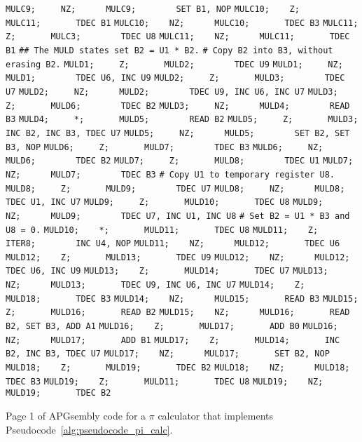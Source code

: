 \begin{apgsembly}
\begin{minipage}[t]{.49\textwidth}
\begin{algorithmic}
			\State \verb|MULC9;     NZ;      MULC9;        SET B1, NOP|
			\State \verb|MULC10;    Z;       MULC11;       TDEC B1|
			\State \verb|MULC10;    NZ;      MULC10;       TDEC B3|
			\State \verb|MULC11;    Z;       MULC3;        TDEC U8|
			\State \verb|MULC11;    NZ;      MULC11;       TDEC B1|
			\State \verb||
			\State \verb|## The MULD states set B2 = U1 * B2.|
			\State \verb|# Copy B2 into B3, without erasing B2.|
			\State \verb|MULD1;     Z;       MULD2;        TDEC U9|
			\State \verb|MULD1;     NZ;      MULD1;        TDEC U6, INC U9|
			\State \verb|MULD2;     Z;       MULD3;        TDEC U7|
			\State \verb|MULD2;     NZ;      MULD2;        TDEC U9, INC U6, INC U7|
			\State \verb|MULD3;     Z;       MULD6;        TDEC B2|
			\State \verb|MULD3;     NZ;      MULD4;        READ B3|
			\State \verb|MULD4;     *;       MULD5;        READ B2|
			\State \verb|MULD5;     Z;       MULD3;        INC B2, INC B3, TDEC U7|
			\State \verb|MULD5;     NZ;      MULD5;        SET B2, SET B3, NOP|
			\State \verb|MULD6;     Z;       MULD7;        TDEC B3|
			\State \verb|MULD6;     NZ;      MULD6;        TDEC B2|
			\State \verb|MULD7;     Z;       MULD8;        TDEC U1|
			\State \verb|MULD7;     NZ;      MULD7;        TDEC B3|
			\State \verb||
			\State \verb|# Copy U1 to temporary register U8.|
			\State \verb|MULD8;     Z;       MULD9;        TDEC U7|
			\State \verb|MULD8;     NZ;      MULD8;        TDEC U1, INC U7|
			\State \verb|MULD9;     Z;       MULD10;       TDEC U8|
			\State \verb|MULD9;     NZ;      MULD9;        TDEC U7, INC U1, INC U8|
			\State \verb||
			\State \verb|# Set B2 = U1 * B3 and U8 = 0.|
			\State \verb|MULD10;    *;       MULD11;       TDEC U8|
			\State \verb|MULD11;    Z;       ITER8;        INC U4, NOP|
			\State \verb|MULD11;    NZ;      MULD12;       TDEC U6|
			\State \verb|MULD12;    Z;       MULD13;       TDEC U9|
			\State \verb|MULD12;    NZ;      MULD12;       TDEC U6, INC U9|
			\State \verb|MULD13;    Z;       MULD14;       TDEC U7|
			\State \verb|MULD13;    NZ;      MULD13;       TDEC U9, INC U6, INC U7|
			\State \verb|MULD14;    Z;       MULD18;       TDEC B3|
			\State \verb|MULD14;    NZ;      MULD15;       READ B3|
			\State \verb|MULD15;    Z;       MULD16;       READ B2|
			\State \verb|MULD15;    NZ;      MULD16;       READ B2, SET B3, ADD A1|
			\State \verb|MULD16;    Z;       MULD17;       ADD B0|
			\State \verb|MULD16;    NZ;      MULD17;       ADD B1|
			\State \verb|MULD17;    Z;       MULD14;       INC B2, INC B3, TDEC U7|
			\State \verb|MULD17;    NZ;      MULD17;       SET B2, NOP|
			\State \verb|MULD18;    Z;       MULD19;       TDEC B2|
			\State \verb|MULD18;    NZ;      MULD18;       TDEC B3|
			\State \verb|MULD19;    Z;       MULD11;       TDEC U8|
			\State \verb|MULD19;    NZ;      MULD19;       TDEC B2|
		\end{algorithmic}
	\end{minipage}
	\caption{Page 1 of APGsembly code for a $\pi$ calculator that implements Pseudocode~\ref{alg:pseudocode_pi_calc}.}\label{alg:apgsembly_pi1}
\end{apgsembly}

